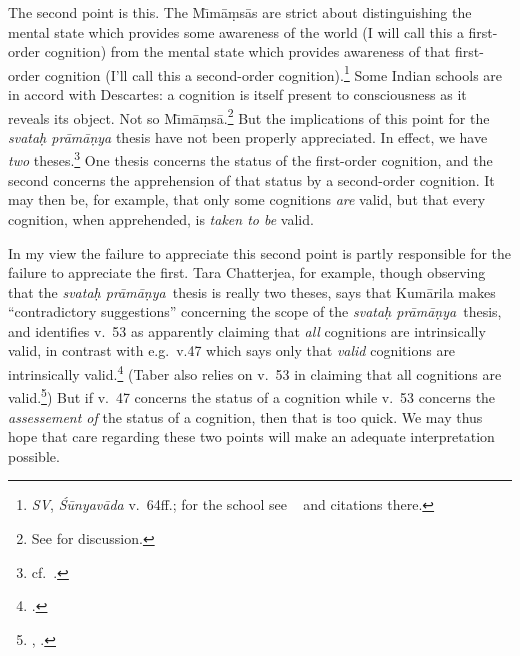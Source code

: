 \documentclass[11pt,letterpaper,oneside]{amsart}
\newcommand{\e}{\emph}
\newcommand{\svapra}{\e{svata\d{h} pr\={a}m\={a}\d{n}ya}}
\begin{document}


The second point is this. The M\={\i}m\=a\d ms\=as are strict about distinguishing the mental state which provides some awareness of the world (I will call this a first-order cognition) from the mental state which provides awareness of that first-order cognition (I'll call this a second-order cognition).\footnote{\emph{SV}, \emph{\'S\=unyav\=ada} v.\ 64ff.; for the school see ~\citet[pp.\ 20--1]{keith1921karma} and citations there.} Some Indian schools are in accord with Descartes: a cognition is itself present to consciousness as it reveals its object. Not so M\={\i}m\=a\d ms\=a.\footnote{See \citet[pref., chs.\ 4, 10]{sen1984concept} for discussion.} But the implications of this point for the \emph{svata\d h pr\=am\=a\d nya} thesis have not been properly appreciated. In effect, we have \emph{two} theses.\footnote{cf.\ \citet[p.\ 41]{chatterjea2003svatah}.} One thesis concerns the status of the first-order cognition, and the second concerns the apprehension of that status by a second-order cognition. It may then be, for example, that only some cognitions \e{are} valid, but that every cognition, when apprehended, is \e{taken to be} valid. 

In my view the failure to appreciate this second point is partly responsible for the failure to appreciate the first. Tara Chatterjea, for example, though observing that the \svapra\ thesis is really two theses, says that Kum\=arila makes ``contradictory suggestions'' concerning the scope of the \svapra\ thesis, and identifies v.\ 53 as apparently claiming that \emph{all} cognitions are intrinsically valid, in contrast with e.g.\ v.47 which says only that \emph{valid} cognitions are intrinsically valid.\footnote{\citet[p.\ 51]{chatterjea2003svatah}.} (Taber also relies on v.\ 53 in claiming that all cognitions are valid.\footnote{\citet[p.\ 171, n.\ 27]{taber2002mo}, \citet[p.\ 212]{taber1992dkb}.}) But if v.\ 47 concerns the status of a cognition while v.\ 53 concerns the \emph{assessement of} the status of a cognition, then that is too quick. We may thus hope that care regarding these two points will make an adequate interpretation possible.




\end{document}
